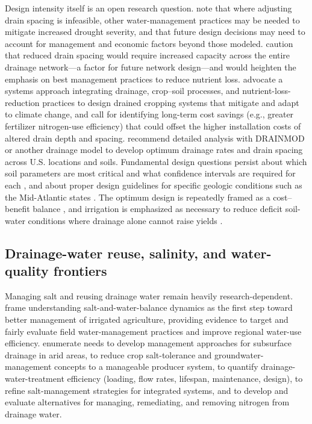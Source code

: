 \documentclass[11pt]{article}
\begin{document}
Design intensity itself is an open research question. \textcite{Dialameh2025} note that where adjusting drain spacing is infeasible, other water-management practices may be needed to mitigate increased drought severity, and that future design decisions may need to account for management and economic factors beyond those modeled. \textcite{Singh2009} caution that reduced drain spacing would require increased capacity across the entire drainage network---a factor for future network design---and would heighten the emphasis on best management practices to reduce nutrient loss. \textcite{Castellano2019} advocate a systems approach integrating drainage, crop--soil processes, and nutrient-loss-reduction practices to design drained cropping systems that mitigate and adapt to climate change, and call for identifying long-term cost savings (e.g., greater fertilizer nitrogen-use efficiency) that could offset the higher installation costs of altered drain depth and spacing. \textcite{Strock2011} recommend detailed analysis with DRAINMOD or another drainage model to develop optimum drainage rates and drain spacing across U.S. locations and soils. Fundamental design questions persist about which soil parameters are most critical and what confidence intervals are required for each \parencite{Ayars2015}, and about proper design guidelines for specific geologic conditions such as the Mid-Atlantic states \parencite{SHIRMOHAMMADI1995}. The optimum design is repeatedly framed as a cost--benefit balance \parencite{HARDJOAMIDJOJO1982}, and irrigation is emphasized as necessary to reduce deficit soil-water conditions where drainage alone cannot raise yields \parencite{HARDJOAMIDJOJO1982}.

\subsection{Drainage-water reuse, salinity, and water-quality frontiers}
Managing salt and reusing drainage water remain heavily research-dependent. \textcite{Jia2007} frame understanding salt-and-water-balance dynamics as the first step toward better management of irrigated agriculture, providing evidence to target and fairly evaluate field water-management practices and improve regional water-use efficiency. \textcite{Ayars2015} enumerate needs to develop management approaches for subsurface drainage in arid areas, to reduce crop salt-tolerance and groundwater-management concepts to a manageable producer system, to quantify drainage-water-treatment efficiency (loading, flow rates, lifespan, maintenance, design), to refine salt-management strategies for integrated systems, and to develop and evaluate alternatives for managing, remediating, and removing nitrogen from drainage water.
\end{document}
